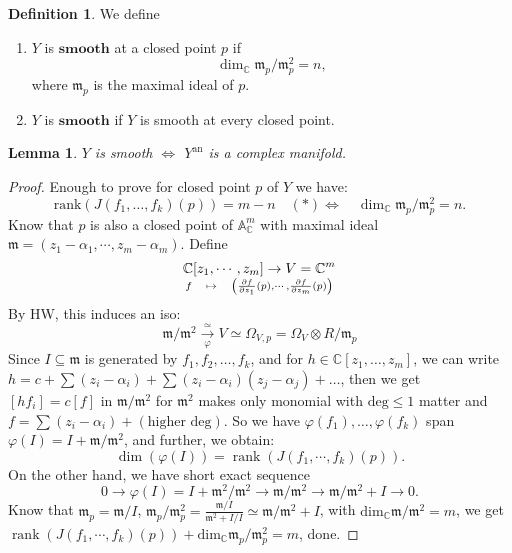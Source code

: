 \documentclass[openany]{book}
\newtheorem{lemma}[theorem]{Lemma}     %
\theoremstyle{definition} %
\newtheorem{definition}[theorem]{Definition} %
\theoremstyle{remark}
\begin{document}
\begin{definition} We define

    \begin{enumerate}
        \item $Y$ is $\textbf{smooth}$ at a closed point $p$ if $$\dim_{\mathbb{C}} \mathfrak{m}_p/\mathfrak{m}_p^2 = n,$$ where $\mathfrak{m}_p$ is the maximal ideal of $p$.
        \item $Y$ is $\textbf{smooth}$ if $Y$ is smooth at every closed point.
    \end{enumerate}
\end{definition}
\begin{lemma}
    $Y$ is smooth $\iff$ $Y^{\text{an}}$ is a complex manifold.
\end{lemma}
\begin{proof}
    Enough to prove for closed point $p$ of $Y$ we have: $$\text{rank}(J(f_1, \ldots, f_k)(p)) = m-n \quad (*)\iff \quad \dim_{\mathbb{C}} \mathfrak{m}_{p}/\mathfrak{m}_p^2 = n.$$Know that $p$ is also a closed point of $\mathbb{A}^{m}_{\mathbb{C}}$ with maximal ideal $\mathfrak{m} = (z_1 - \alpha_1, \cdots, z_m - \alpha_m)$. Define $$\mathbb{C}[z_1, \cdots, z_m] \to V = \mathbb{C}^m\atop f \quad \mapsto \quad \left( \frac{\partial f}{\partial z_1}(p), \cdots, \frac{\partial f}{\partial z_m}(p) \right)$$By HW, this induces an iso:$$
        \mathfrak{\mathfrak{m}} /\mathfrak{m}^2 \xrightarrow[\varphi]{\simeq} V\simeq \Omega_{V,p}=\Omega_{V}\otimes R/\mathfrak{m}_{p}$$Since $I\subseteq \mathfrak{m}$ is generated by $f_{1},f_{2},\dots,f_{k}$, and for $h\in \mathbb{C}[z_{1},\dots,z_{m}]$, we can write $h=c+\sum(z_{i}-\alpha_{i})+\sum(z_{i}-\alpha_{i})(z_{j}-\alpha_{j})+\dots$, then we get $[hf_{i}]=c[f]$ in $\mathfrak{m} /\mathfrak{m}^{2}$ for $\mathfrak{m}^{2}$ makes only monomial with $\mathrm{deg}\leq 1$ matter and $f=\sum(z_{i}-\alpha_{i})+(\text{higher deg})$. So we have $\varphi(f_{1}),\dots,\varphi(f_{k})$ span $\varphi(I)=I+\mathfrak{m} /\mathfrak{m}^{2}$, and further, we obtain: $$
        \dim(\varphi(I)) = \operatorname{rank} \left( J(f_1, \cdots, f_k)(p) \right).
    $$
    On the other hand, we have short exact sequence $$0\rightarrow\varphi(I)=I+\mathfrak{m}^{2} /\mathfrak{m}^{2}\rightarrow \mathfrak{m} /\mathfrak{m}^{2}\rightarrow \mathfrak{m}/\mathfrak{m}^{2}+I\rightarrow 0.$$
    Know that $\mathfrak{m}_{p}=\mathfrak{m} /I$, $\mathfrak{m}_{p} /\mathfrak{m}_{p}^{2}=\frac{\mathfrak{m}/I}{\mathfrak{m}^{2}+I /I}\simeq \mathfrak{m} /\mathfrak{m}^{2}+I$,  with $\mathrm{dim}_{\mathbb{C}} \mathfrak{m} /\mathfrak{m}^{2}=m$, we get $\operatorname{rank} \left( J(f_1, \cdots, f_k)(p) \right)+\mathrm{dim}_{\mathbb{C}}\mathfrak{m}_{p} /\mathfrak{m}_{p}^{2}=m$, done.
\end{proof}
\quad
\end{document}
